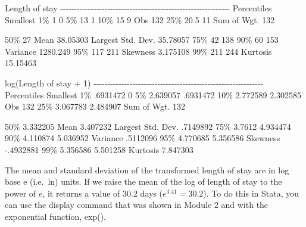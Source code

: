 \documentclass[
]{memoir}
\newenvironment{Shaded}{\begin{snugshade}}{\end{snugshade}}
\newcommand{\NormalTok}[1]{#1}
\begin{document}
\begin{Shaded}
\begin{Highlighting}[]
\NormalTok{                       Length of stay}
\NormalTok{{-}{-}{-}{-}{-}{-}{-}{-}{-}{-}{-}{-}{-}{-}{-}{-}{-}{-}{-}{-}{-}{-}{-}{-}{-}{-}{-}{-}{-}{-}{-}{-}{-}{-}{-}{-}{-}{-}{-}{-}{-}{-}{-}{-}{-}{-}{-}{-}{-}{-}{-}{-}{-}{-}{-}{-}{-}{-}{-}{-}{-}}
\NormalTok{      Percentiles      Smallest}
\NormalTok{ 1\%            1              0}
\NormalTok{ 5\%           13              1}
\NormalTok{10\%           15              9       Obs                 132}
\NormalTok{25\%         20.5             11       Sum of Wgt.         132}

\NormalTok{50\%           27                      Mean           38.05303}
\NormalTok{                        Largest       Std. Dev.      35.78057}
\NormalTok{75\%           42            138}
\NormalTok{90\%           60            153       Variance       1280.249}
\NormalTok{95\%          117            211       Skewness       3.175108}
\NormalTok{99\%          211            244       Kurtosis       15.15463}

\NormalTok{                   log(Length of stay + 1)}
\NormalTok{{-}{-}{-}{-}{-}{-}{-}{-}{-}{-}{-}{-}{-}{-}{-}{-}{-}{-}{-}{-}{-}{-}{-}{-}{-}{-}{-}{-}{-}{-}{-}{-}{-}{-}{-}{-}{-}{-}{-}{-}{-}{-}{-}{-}{-}{-}{-}{-}{-}{-}{-}{-}{-}{-}{-}{-}{-}{-}{-}{-}{-}}
\NormalTok{      Percentiles      Smallest}
\NormalTok{ 1\%     .6931472              0}
\NormalTok{ 5\%     2.639057       .6931472}
\NormalTok{10\%     2.772589       2.302585       Obs                 132}
\NormalTok{25\%     3.067783       2.484907       Sum of Wgt.         132}

\NormalTok{50\%     3.332205                      Mean           3.407232}
\NormalTok{                        Largest       Std. Dev.      .7149892}
\NormalTok{75\%       3.7612       4.934474}
\NormalTok{90\%     4.110874       5.036952       Variance       .5112096}
\NormalTok{95\%     4.770685       5.356586       Skewness      {-}.4932881}
\NormalTok{99\%     5.356586       5.501258       Kurtosis       7.847303}
\end{Highlighting}
\end{Shaded}

The mean and standard deviation of the transformed length of stay are in log base e (i.e.~ln) units. If we raise the mean of the log of length of stay to the power of \(e\), it returns a value of 30.2 days (\(e^{3.41}=30.2\)). To do this in Stata, you can use the display command that was shown in Module 2 and with the exponential function, exp().
\end{document}
